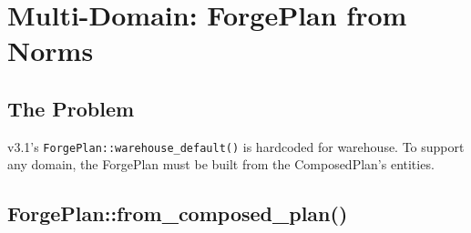 \documentclass[11pt,a4paper]{article}
\begin{document}
\section{Multi-Domain: ForgePlan from Norms}

\subsection{The Problem}

v3.1's \texttt{ForgePlan::warehouse\_default()} is hardcoded for
warehouse. To support any domain, the ForgePlan must be built
from the ComposedPlan's entities.

\subsection{ForgePlan::from\_composed\_plan()}
\end{document}
